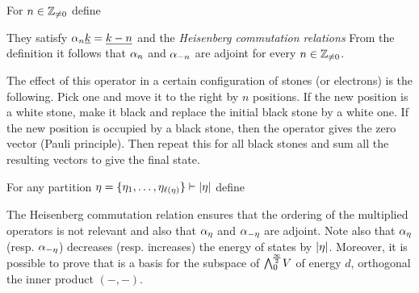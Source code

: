 \documentclass[10pt,handout]{beamer} %
\begin{document}
\begin{frame}

\begin{definition}
For $n\in\mathbb Z_{\neq0}$ define\\[-18pt]
\end{definition}\pause

They satisfy $\alpha_n\underline{k}=\underline{k-n}$ and the \emph{Heisenberg commutation relations}
From the definition it follows that $\alpha_n$ and $\alpha_{-n}$ are adjoint for every $n\in\mathbb Z_{\neq0}$.\pause

The effect of this operator in a certain configuration of stones (or electrons) is the following. Pick one and move it to the right by $n$ positions. If the new position is a white stone, make it black and replace the initial black stone by a white one. If the new position is occupied by a black stone, then the operator gives the zero vector (Pauli principle). Then repeat this for all black stones and sum all the resulting vectors to give the final state.

\end{frame}

\begin{frame}

\begin{definition}
For any partition $\eta=\{\eta_1,\ldots,\eta_{\ell(\eta)}\}\vdash|\eta|$ define
\end{definition}\pause

The Heisenberg commutation relation ensures that the ordering of the multiplied operators is not relevant and also that $\alpha_\eta$ and $\alpha_{-\eta}$ are adjoint. \pause Note also that $\alpha_{\eta}$ (resp. $\alpha_{-\eta}$) decreases (resp. increases) the energy of states by $|\eta|$. \pause Moreover, it is possible to prove that 
is a basis for the subspace of $\bigwedge^{\!\frac\infty2}_0\!V$ of energy $d$, orthogonal \wrt the inner product $(-,-)$.

\end{frame}
\end{document}
